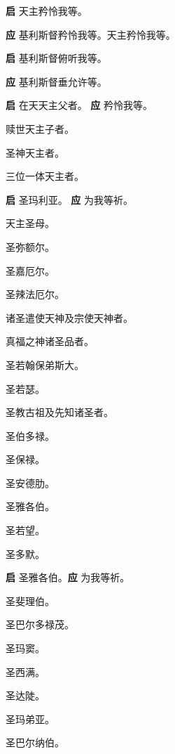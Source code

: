 \documentclass[UTF8,17pt]{ctexart}
\begin{document}
\textbf{启} \quad 天主矜怜我等。

\textbf{应} \quad 基利斯督矜怜我等。天主矜怜我等。

\textbf{启} \quad 基利斯督俯听我等。

\textbf{应} \quad 基利斯督垂允许等。

\textbf{启} \quad 在天天主⽗者。 \hfill \textbf{应} \quad 矜怜我等。

 赎世天主⼦者。

 圣神天主者。

 三位⼀体天主者。

\textbf{启} \quad 圣玛利亚。 \hfill \textbf{应} \quad 为我等祈。

 天主圣母。

 圣弥额尔。

 圣嘉厄尔。

 圣辣法厄尔。

 诸圣遣使天神及宗使天神者。

 真福之神诸圣品者。

 圣若翰保弟斯⼤。

 圣若瑟。

 圣教古祖及先知诸圣者。

 圣伯多禄。

 圣保禄。

 圣安德肋。

 圣雅各伯。

 圣若望。

 圣多默。

\textbf{启} \quad 圣雅各伯。\hfill \textbf{应} \quad 为我等祈。

 圣斐理伯。

 圣巴尔多禄茂。

 圣玛窦。

 圣西满。

 圣达陡。

 圣玛弟亚。

 圣巴尔纳伯。
\end{document}
